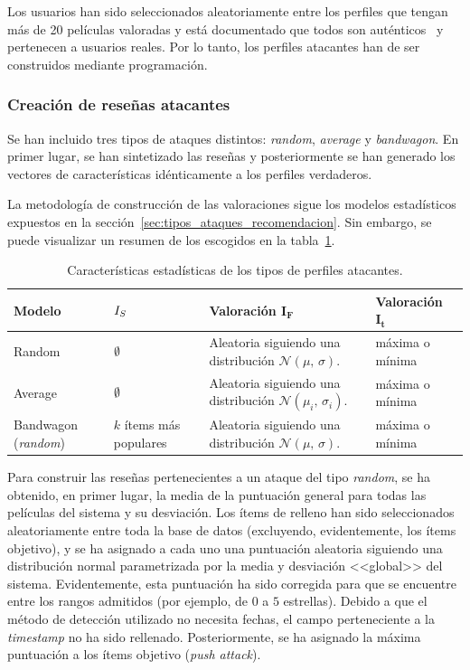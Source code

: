 Los usuarios han sido seleccionados aleatoriamente entre los perfiles que tengan más de 20 películas valoradas y está documentado que todos son auténticos~\cite{zhou2021SemisupervisedRecommendationAttack} y pertenecen a usuarios reales. Por lo tanto, los perfiles atacantes han de ser construidos mediante programación.

\subsubsection{Creación de reseñas atacantes}
\label{sec:creacion_reseñas_atacantes}

Se han incluido tres tipos de ataques distintos: \textit{random}, \textit{average} y \textit{bandwagon}. En primer lugar, se han sintetizado las reseñas y posteriormente se han generado los vectores de características idénticamente a los perfiles verdaderos.

La metodología de construcción de las valoraciones sigue los modelos estadísticos expuestos en la sección~\ref{sec:tipos_ataques_recomendacion}. Sin embargo, se puede visualizar un resumen de los escogidos en la tabla~\ref{ataques_coforest}.

\begin{table}
\begin{centering}
	\begin{tabular}{@{}p{5em} p{6em} p{11em} p{8em}@{}}
		\toprule
		\textbf{Modelo} & $\hfil{I_S}$ & \textbf{Valoración} $\mathbf{I_F}$ &  \textbf{Valoración} $\mathbf{I_t}$\\ 
		\midrule
		Random & $\hfil\emptyset$ & Aleatoria siguiendo una distribución $\mathcal{N}(\mu,\,\sigma)$. & máxima o mínima \\
		Average & $\hfil\emptyset$ & Aleatoria siguiendo una distribución $\mathcal{N}(\mu_i,\,\sigma_i)$. & máxima o mínima\\
		Bandwagon (\textit{random}) &\centering$k$ ítems más populares & Aleatoria siguiendo una distribución $\mathcal{N}(\mu,\,\sigma)$. & máxima o mínima\\
		\bottomrule
	\end{tabular}
	\caption[Experimentación: características de ataques a detectar]{Características estadísticas de los tipos de perfiles atacantes.}
	\label{ataques_coforest}	
\end{centering}
\end{table}

Para construir las reseñas pertenecientes a un ataque del tipo \textit{random}, se ha obtenido, en primer lugar, la media de la puntuación general para todas las películas del sistema y su desviación. Los ítems de relleno han sido seleccionados aleatoriamente entre toda la base de datos (excluyendo, evidentemente, los ítems objetivo), y se ha asignado a cada uno una puntuación aleatoria siguiendo una distribución normal parametrizada por la media y desviación <<global>> del sistema. Evidentemente, esta puntuación ha sido corregida para que se encuentre entre los rangos admitidos (por ejemplo, de $0$ a $5$ estrellas). Debido a que el método de detección utilizado no necesita fechas, el campo perteneciente a la \textit{timestamp} no ha sido rellenado. Posteriormente, se ha asignado la máxima puntuación a los ítems objetivo (\textit{push attack}).

